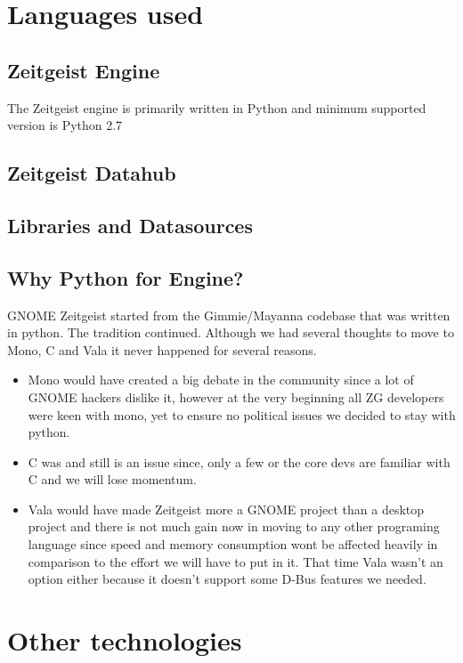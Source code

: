 \section{Languages used}

\subsection{Zeitgeist Engine}
The Zeitgeist engine is primarily written in Python and minimum supported version is Python 2.7

\subsection{Zeitgeist Datahub}


\subsection{Libraries and Datasources}
\subsection{Why Python for Engine?}
GNOME Zeitgeist started from the Gimmie/Mayanna codebase that was written 
in python. The tradition continued. Although we had several thoughts to move 
to Mono, C and Vala it never happened for several reasons. 
\begin{itemize}
\item Mono would have created a big debate in the community since a lot of 
GNOME hackers dislike it, however at the very beginning all ZG developers were 
keen with mono, yet to ensure no political issues we decided to stay with python.
\item C was and still is an issue since, only a few or the core devs are familiar 
with C and we will lose momentum.
\item Vala would have made Zeitgeist more a GNOME project than a desktop project 
and there is not much gain now in moving to any other programing language since 
speed and memory consumption wont be affected heavily in comparison to the effort 
we will have to put in it. That time Vala wasn't an option either because it 
doesn't support some D-Bus features we needed.
\end{itemize}




\section{Other technologies}
